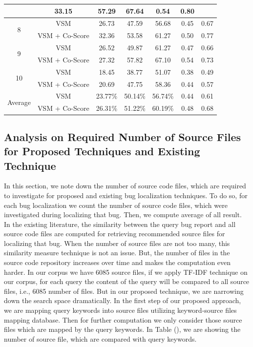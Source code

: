 \documentclass{sig-alternate}
\begin{document}
\begin{table}[]
\begin{tabular}{@{}|c|c|c|c|c|c|c|@{}}
		&33.15 &
		57.29 &
		67.64 & 0.54 &
		0.80     \\  \midrule
	\multirow{2}{*}{8}                                                                               & VSM & 26.73 & 47.59 & 56.68 & 0.45 & 0.67 \\   &VSM + Co-Score 
		&32.36 &
		53.58 &
		61.27 & 0.50 &
		0.77    \\  \midrule
		\multirow{2}{*}{9}                                                                               & VSM & 26.52 & 49.87 & 61.27 & 0.47 & 0.66 \\   &VSM + Co-Score 
		&27.32 &
		57.82 &
		67.10 & 0.54 &
		0.73    \\  \midrule
		\multirow{2}{*}{10}                                                                               & VSM & 18.45 & 38.77 & 51.07 & 0.38 & 0.49 \\   &VSM + Co-Score
		&20.69 &
		47.75 &
		58.36 & 0.44 &
		0.57    \\  \midrule
	\multirow{2}{*}{Average}                                                                               & VSM & 23.77\% & 50.14\% & 56.74\% & 0.44 & 0.61 \\   &VSM + Co-Score      & 26.31\%                                                 & 51.22\%                                                 & 60.19\%                                                  &   0.48  &  0.68    \\ \bottomrule
		
	\end{tabular}
\end{table}

\subsection{Analysis on Required Number of Source Files for Proposed Techniques and Existing Technique}
In this section, we note down the number of source code files, which are required to investigate for proposed and existing bug localization techniques. To do so, for each bug localization we count the number of source code files, which were investigated during localizing that bug. Then, we compute average of all result. In the existing literature, the similarity between the query bug report and all source code files are computed for retrieving recommended source files for localizing that bug. When the number of source files are not too many, this similarity measure technique is not an issue. But, the number of files in the source code repository increases over time and makes the computation even harder. In our corpus we have 6085 source files, if we apply TF-IDF technique on our corpus, for each query the content of the query will be compared to all source files, i.e., 6085 number of files. But in our proposed technique, we are narrowing down the search space dramatically. In the first step of our proposed approach, we are mapping query keywords into source files utilizing keyword-source files mapping database. Then for further computation we only consider those source files which are mapped by the query keywords. In Table (), we are showing the number of source file, which are compared with query keywords. 
\end{document}
